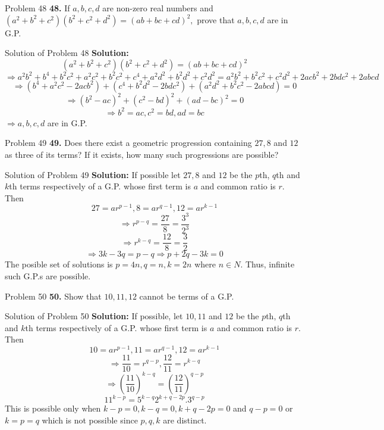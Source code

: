 \documentclass[aspectratio=1610,8pt]{beamer}
\begin{document}
\begin{frame}{Problem 48}
  \textbf{48.} If $a, b, c, d$ are non-zero real numbers and $(a^2 + b^2 + c^2)(b^2 + c^2 + d^2) = (ab + bc + cd)^2,$ prove that
  $a, b, c, d$ are in G.P.
\end{frame}
\begin{frame}{Solution of Problem 48}
  \textbf{Solution:}$$(a^2 + b^2 + c^2)(b^2 + c^2 + d^2) = (ab + bc + cd)^2$$
  $$\Rightarrow a^2b^2 + b^4 + b^2c^2 + a^2c^2 + b^2c^2 + c^4 + a^2d^2 + b^2d^2 + c^2d^2 = a^2b^2 + b^2c^2 + c^2d^2 + 2acb^2 +
  2bdc^2 + 2abcd$$
  $$\Rightarrow (b^4 + a^2c^2 - 2acb^2) + (c^4 + b^2d^2 - 2bdc^2) + (a^2d^2 + b^2c^2 - 2abcd) = 0$$
  $$\Rightarrow (b^2 - ac)^2 + (c^2 - bd)^2 + (ad - bc)^2 = 0$$
  $$\Rightarrow b^2 = ac, c^2 = bd, ad = bc$$
  $\Rightarrow a, b, c, d$ are in G.P.
\end{frame}
\begin{frame}{Problem 49}
  \textbf{49.} Does there exist a geometric progression containing $27, 8$ and $12$ as three of its terms? If it exists, how many
  such progressions are possible?
\end{frame}
\begin{frame}{Solution of Problem 49}
  \textbf{Solution:} If possible let $27, 8$ and $12$ be the $p$th, $q$th and $k$th terms respectively of a G.P. whose first term
  is $a$ and common ratio is $r.$ Then
  $$27 = ar^{p - 1}, 8 = ar^{q - 1}, 12 = ar^{k- 1}$$
  $$\Rightarrow r^{p - q} = \frac{27}{8} = \frac{3^3}{2^3}$$
  $$\Rightarrow r^{k - q} = \frac{12}{8} = \frac{3}{2}$$
  $$\Rightarrow 3k - 3q = p - q \Rightarrow p + 2q - 3k = 0$$
  The posible set of solutions is $p = 4n, q = n, k= 2n$ where $n\in N.$ Thus, infinite such G.P.s are possible.
\end{frame}
\begin{frame}{Problem 50}
  \textbf{50.} Show that $10, 11, 12$ cannot  be terms of a G.P.
\end{frame}
\begin{frame}{Solution of Problem 50}
  \textbf{Solution:} If possible, let $10, 11$ and $12$ be the $p$th, $q$th and $k$th terms respectively of a G.P. whose first term
  is $a$ and common ratio is $r.$ Then
  $$10 = ar^{p - 1}, 11 = ar^{q - 1}, 12 = ar^{k - 1}$$
  $$\Rightarrow \frac{11}{10} = r^{q - p}, \frac{12}{11} = r^{k - q}$$
  $$\Rightarrow \left(\frac{11}{10}\right)^{k - q} = \left(\frac{12}{11}\right)^{q - p}$$
  $$11^{k - p} = 5^{k - q}2^{k + q - 2p}.3^{q - p}$$
  This is possible only when $k - p = 0, k - q = 0, k + q - 2p = 0$ and $q - p = 0$ or $k = p = q$ which is not possible since $p,
  q, k$ are distinct.
\end{frame}
\end{document}

